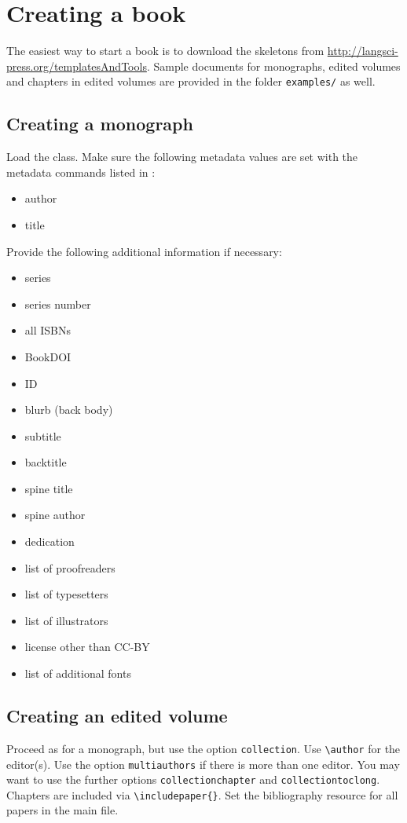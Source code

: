 \documentclass[%
output=guidelines,
guidelines]{langscibook}
\begin{document}
\chapter{Creating a book}
The easiest way to start a book is to download the skeletons from \url{http://langsci-press.org/templatesAndTools}. Sample documents for monographs, edited volumes and chapters in edited volumes are provided in the folder \texttt{examples/} as well. 

\section{Creating a monograph}
Load the class. Make sure the following metadata values are set with the metadata commands listed in :

\begin{itemize}
 \item author 
 \item title
\end{itemize}

Provide the following additional information if necessary:
\begin{itemize}
 \item series 
 \item series number
 \item all ISBNs
 \item BookDOI
 \item ID
 \item blurb (back body)
 \item subtitle
 \item backtitle
 \item spine title 
 \item spine author
 \item dedication 
 \item list of proofreaders 
 \item list of typesetters
 \item list of illustrators 
 \item license other than CC-BY
 \item list of additional fonts
\end{itemize}

 
\section{Creating an edited volume}
Proceed as for a monograph, but use the option \texttt{collection}. Use \verb+\author+ for the editor(s). Use the option \texttt{multiauthors} if there is more than one editor. You may want to use the further options \texttt{collectionchapter} and \texttt{collectiontoclong}. Chapters are included via \verb+\includepaper{}+. Set the bibliography resource for all papers in the main file. 
\end{document}
